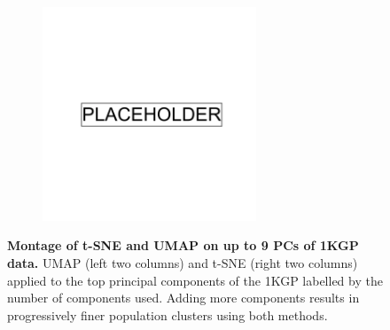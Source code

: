 \begin{figure}
    \centering
    \begin{subfigure}{\textwidth}
    \includegraphics[width=0.7\textwidth]{placeholder.png}
    \end{subfigure}
    \caption[Montage of t-SNE and UMAP on up to 9 PCs of 1KGP data]{\textbf{Montage of t-SNE and UMAP on up to 9 PCs of 1KGP data.} UMAP (left two columns) and t-SNE (right two columns) applied to the top principal components of the 1KGP labelled by the number of components used. Adding more components results in progressively finer population clusters using both methods.}
    \label{fig:supp_megamontage_pc2_9}  
\end{figure}

\newpage

